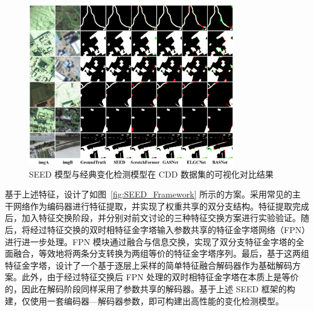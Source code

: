\begin{figure}[!htbp]
  \centering
  \includegraphics[width=0.8\textwidth]{paper_figures/变化检测任务基础范式设计/seed_cdd.png}
  \caption{SEED 模型与经典变化检测模型在 CDD 数据集的可视化对比结果}
  \label{fig:seed_cdd}
\end{figure}

基于上述特征，设计了如图~\ref{fig:SEED_Framework} 所示的方案。采用常见的主干网络作为编码器进行特征提取，并实现了权重共享的双分支结构。特征提取完成后，加入特征交换阶段，并分别对前文讨论的三种特征交换方案进行实验验证。随后，将经过特征交换的双时相特征金字塔输入参数共享的特征金字塔网络（FPN）进行进一步处理。FPN 模块通过融合与信息交换，实现了双分支特征金字塔的全面融合，等效地将两条分支转换为两组等价的特征金字塔序列。最后，基于这两组特征金字塔，设计了一个基于逐层上采样的简单特征融合解码器作为基础解码方案。此外，由于经过特征交换后 FPN 处理的双时相特征金字塔在本质上是等价的，因此在解码阶段同样采用了参数共享的解码器。基于上述 SEED 框架的构建，仅使用一套编码器—解码器参数，即可构建出高性能的变化检测模型。  


